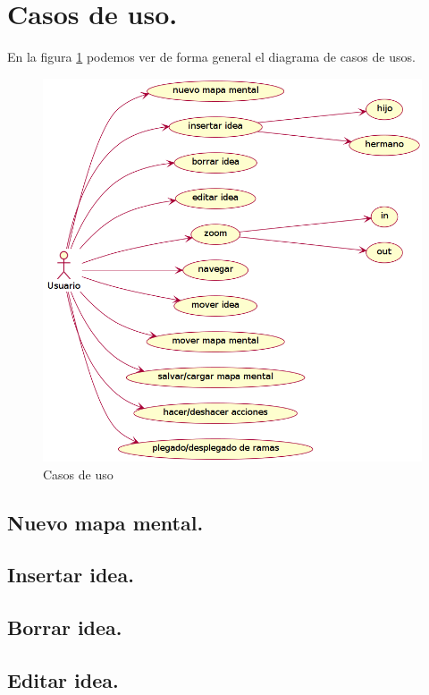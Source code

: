 \section{Casos de uso.}

En la figura \ref{fig:casosdeuso} podemos ver de forma general el diagrama de casos de usos.

\begin{figure}[htbp]
\centering
\includegraphics[width=\textwidth]{imagenes/casos-de-uso}
\caption{Casos de uso}
\label{fig:casosdeuso}
\end{figure}

\subsection{Nuevo mapa mental.}

\subsection{Insertar idea.}

\subsection{Borrar idea.}

\subsection{Editar idea.}

